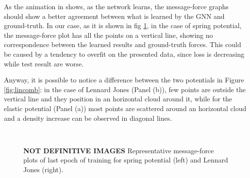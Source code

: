 \documentclass[../../master_thesis_np.tex]{subfiles}
\begin{document}
As the animation in \cite{cranmer_discovering_2020} shows, as the network learns, the message-force graphs should show a better agreement between what is learned by the GNN and ground-truth.
In our case, as it is shown in fig \ref{fig:lincomb_last}, in the case of spring potential, the message-force plot has all the points on a vertical line, showing no correspondence between the learned results and ground-truth forces.
This could be caused by a tendency to overfit on the presented data, since loss is decreasing while test result are worse.


Anyway, it is possible to notice a difference between the two potentials in Figure \ref{fig:lincomb}: in the case of Lennard Jones (Panel (b)), few points are outside the vertical line and they position in an horizontal cloud around it, while for the elastic potential (Panel (a)) most points are scattered around an horizontal cloud and a density increase can be observed in diagonal lines.

\begin{figure}[tp]
	\centering
	\\
	\caption{\textbf{NOT DEFINITIVE IMAGES} Representative message-force plots of last epoch of training for spring potential (left) and Lennard Jones (right).}
	\label{fig:lincomb_last}
\end{figure}
\end{document}
